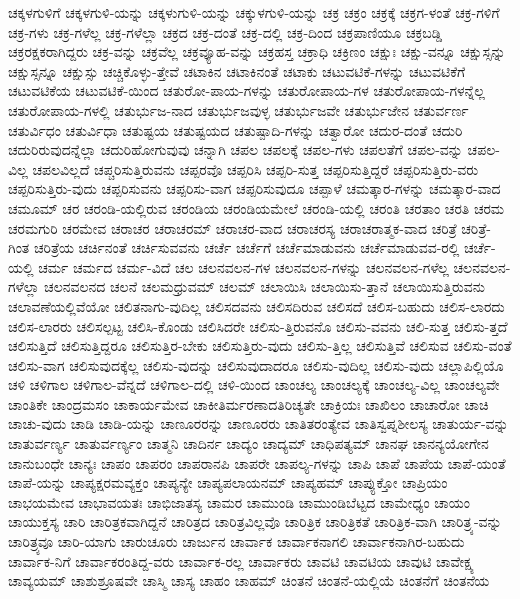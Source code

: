 {ಚಕ್ಕಳಗುಳಿಗೆ
ಚಕ್ಕಳಗುಳಿ-ಯನ್ನು
ಚಕ್ಕಳುಗುಳಿ-ಯನ್ನು
ಚಕ್ಕುಳಗುಳಿ-ಯನ್ನು
ಚಕ್ರ
ಚಕ್ರಂ
ಚಕ್ರಕ್ಕೆ
ಚಕ್ರಗ-ಳಂತೆ
ಚಕ್ರ-ಗಳಿಗೆ
ಚಕ್ರ-ಗಳು
ಚಕ್ರ-ಗಳೆಲ್ಲ
ಚಕ್ರ-ಗಳೆಲ್ಲಾ
ಚಕ್ರದ
ಚಕ್ರ-ದಂತೆ
ಚಕ್ರ-ದಲ್ಲಿ
ಚಕ್ರ-ದಿಂದ
ಚಕ್ರಪಾಣಿಯೂ
ಚಕ್ರಬಡ್ಡಿ
ಚಕ್ರರಕ್ಷಕರಾಗಿದ್ದರು
ಚಕ್ರ-ವನ್ನು
ಚಕ್ರವೆಲ್ಲ
ಚಕ್ರವ್ಯೂಹ-ವನ್ನು
ಚಕ್ರಹಸ್ತ
ಚಕ್ರಾಧಿ
ಚಕ್ರಿಣಂ
ಚಕ್ಷುಃ
ಚಕ್ಷು-ವನ್ನೂ
ಚಕ್ಷುಸ್ಸನ್ನು
ಚಕ್ಷುಸ್ಸನ್ನೂ
ಚಕ್ಷುಸ್ಸು
ಚಚ್ಚಿಕೊಳ್ಳು-ತ್ತೇವೆ
ಚಟಾಕಿನ
ಚಟಾಕಿನಂತೆ
ಚಟಾಕು
ಚಟುವಟಿಕೆ-ಗಳನ್ನು
ಚಟುವಟಿಕೆಗೆ
ಚಟುವಟಿಕೆಯ
ಚಟುವಟಿಕೆ-ಯಿಂದ
ಚತುರೋ-ಪಾಯ-ಗಳನ್ನು
ಚತುರೋಪಾಯ-ಗಳ
ಚತುರೋಪಾಯ-ಗಳನ್ನೆಲ್ಲ
ಚತುರೋಪಾಯ-ಗಳಲ್ಲಿ
ಚತುರ್ಭುಜ-ನಾದ
ಚತುರ್ಭುಜವುಳ್ಳ
ಚತುರ್ಭುಜವೇ
ಚತುರ್ಭುಜೇನ
ಚತುರ್ವರ್ಣ
ಚತುರ್ವಿಧಂ
ಚತುರ್ವಿಧಾ
ಚತುಷ್ಟಯ
ಚತುಷ್ಟಯದ
ಚತುಷ್ಪಾದಿ-ಗಳನ್ನು
ಚತ್ವಾರೋ
ಚದುರ-ದಂತೆ
ಚದುರಿ
ಚದುರಿರುವುದನ್ನೆಲ್ಲಾ
ಚದುರಿಹೋಗುವುವು
ಚನ್ನಾಗಿ
ಚಪಲ
ಚಪಲಕ್ಕೆ
ಚಪಲ-ಗಳು
ಚಪಲತೆಗೆ
ಚಪಲ-ವನ್ನು
ಚಪಲ-ವಿಲ್ಲ
ಚಪಲವಿಲ್ಲದೆ
ಚಪ್ಚರಿಸುತ್ತಿರುವನು
ಚಪ್ಪರವೊ
ಚಪ್ಪರಿಸಿ
ಚಪ್ಪರಿ-ಸುತ್ತ
ಚಪ್ಪರಿಸುತ್ತಿದ್ದರೆ
ಚಪ್ಪರಿಸುತ್ತಿರು-ವರು
ಚಪ್ಪರಿಸುತ್ತಿರು-ವುದು
ಚಪ್ಪರಿಸುವನು
ಚಪ್ಪರಿಸು-ವಾಗ
ಚಪ್ಪರಿಸುವುದೂ
ಚಪ್ಪಾಳೆ
ಚಮತ್ಕಾರ-ಗಳನ್ನು
ಚಮತ್ಕಾರ-ವಾದ
ಚಮೂಮ್
ಚರ
ಚರಂಡಿ-ಯಲ್ಲಿರುವ
ಚರಂಡಿಯ
ಚರಂಡಿಯಮೇಲೆ
ಚರಂಡಿ-ಯಲ್ಲಿ
ಚರಂತಿ
ಚರತಾಂ
ಚರತಿ
ಚರಮ
ಚರಮಗುರಿ
ಚರಮೇವ
ಚರಾಚರ
ಚರಾಚರಮ್
ಚರಾಚರ-ವಾದ
ಚರಾಚರಸ್ಯ
ಚರಾಚರಾತ್ಮಕ-ವಾದ
ಚರಿತ್ರೆ
ಚರಿತ್ರೆ-ಗಿಂತ
ಚರಿತ್ರೆಯ
ಚರ್ಚಿನಂತೆ
ಚರ್ಚಿಸುವವನು
ಚರ್ಚೆ
ಚರ್ಚೆಗೆ
ಚರ್ಚೆಮಾಡುವನು
ಚರ್ಚೆಮಾಡುವವ-ರಲ್ಲಿ
ಚರ್ಚೆ-ಯಲ್ಲಿ
ಚರ್ಮ
ಚರ್ಮದ
ಚರ್ಮ-ವಿದೆ
ಚಲ
ಚಲನವಲನ-ಗಳ
ಚಲನವಲನ-ಗಳನ್ನು
ಚಲನವಲನ-ಗಳೆಲ್ಲ
ಚಲನವಲನ-ಗಳೆಲ್ಲಾ
ಚಲನವಲನದ
ಚಲನೆ
ಚಲಮಧ್ರುವಮ್
ಚಲಮ್
ಚಲಾಯಿಸಿ
ಚಲಾಯಿಸು-ತ್ತಾನೆ
ಚಲಾಯಿಸುತ್ತಿರುವನು
ಚಲಾವಣೆಯಲ್ಲಿವೆಯೋ
ಚಲಿತನಾಗು-ವುದಿಲ್ಲ
ಚಲಿಸದವನು
ಚಲಿಸದಿರುವ
ಚಲಿಸದೆ
ಚಲಿಸ-ಬಹುದು
ಚಲಿಸ-ಲಾರದು
ಚಲಿಸ-ಲಾರರು
ಚಲಿಸಲ್ಪಟ್ಟ
ಚಲಿಸಿ-ಕೊಂಡು
ಚಲಿಸಿದರೇ
ಚಲಿಸು-ತ್ತಿರುವನೊ
ಚಲಿಸು-ವವನು
ಚಲಿ-ಸುತ್ತ
ಚಲಿಸು-ತ್ತದೆ
ಚಲಿಸುತ್ತಿದೆ
ಚಲಿಸುತ್ತಿದ್ದರೂ
ಚಲಿಸುತ್ತಿರ-ಬೇಕು
ಚಲಿಸುತ್ತಿರು-ವುದು
ಚಲಿಸು-ತ್ತಿಲ್ಲ
ಚಲಿಸುತ್ತಿವೆ
ಚಲಿಸುವ
ಚಲಿಸು-ವಂತೆ
ಚಲಿಸು-ವಾಗ
ಚಲಿಸುವುದಕ್ಕೆಲ್ಲ
ಚಲಿಸು-ವುದನ್ನು
ಚಲಿಸುವುದಾದರೂ
ಚಲಿಸು-ವುದಿಲ್ಲ
ಚಲಿಸು-ವುದು
ಚಲ್ಲಾಪಿಲ್ಲಿಯೊ
ಚಳಿ
ಚಳಿಗಾಲ
ಚಳಿಗಾಲ-ವೆನ್ನದೆ
ಚಳಿಗಾಲ-ದಲ್ಲಿ
ಚಳಿ-ಯಿಂದ
ಚಾಂಚಲ್ಯ
ಚಾಂಚಲ್ಯಕ್ಕೆ
ಚಾಂಚಲ್ಯ-ವಿಲ್ಲ
ಚಾಂಚಲ್ಯವೇ
ಚಾಂತಿಕೇ
ಚಾಂದ್ರಮಸಂ
ಚಾಕಾರ್ಯಮೇವ
ಚಾಕೀತಿರ್ಮರಣಾದತಿರಿಚ್ಯತೇ
ಚಾಕ್ರಿಯಃ
ಚಾಖಿಲಂ
ಚಾಚಾರೋ
ಚಾಚಿ
ಚಾಚು-ವುದು
ಚಾಡಿ
ಚಾಡಿ-ಯನ್ನು
ಚಾಣೂರರನ್ನು
ಚಾಣೂರರು
ಚಾತಿತರಂತ್ಯೇವ
ಚಾತಿಸ್ವಪ್ನಶೀಲಸ್ಯ
ಚಾತುರ್ಯ-ವನ್ನು
ಚಾತುರ್ವರ್ಣ್ಯ
ಚಾತುರ್ವರ್ಣ್ಯಂ
ಚಾತ್ಮನಿ
ಚಾದಿರ್ನ
ಚಾದ್ಯಂ
ಚಾದ್ಯಮ್
ಚಾಧಿಪತ್ಯಮ್
ಚಾನಘ
ಚಾನನ್ಯಯೋಗೇನ
ಚಾನುಬಂಧೇ
ಚಾನ್ಯಃ
ಚಾಪಂ
ಚಾಪರಂ
ಚಾಪರಾನಪಿ
ಚಾಪರೇ
ಚಾಪಲ್ಯ-ಗಳನ್ನು
ಚಾಪಿ
ಚಾಪೆ
ಚಾಪೆಯ
ಚಾಪೆ-ಯಂತೆ
ಚಾಪೆ-ಯನ್ನು
ಚಾಪ್ಯಕ್ಷರಮವ್ಯಕ್ತಂ
ಚಾಪ್ಯನ್ಯೇ
ಚಾಪ್ಯಪಲಾಯನಮ್
ಚಾಪ್ಯಹಮ್
ಚಾಪ್ಯುಕ್ತೋ
ಚಾಪ್ರಿಯಂ
ಚಾಭಯಮೇವ
ಚಾಭಾವಯತಃ
ಚಾಭಿಜಾತಸ್ಯ
ಚಾಮರ
ಚಾಮುಂಡಿ
ಚಾಮುಂಡಿಬೆಟ್ಟದ
ಚಾಮೇಧ್ಯಂ
ಚಾಯಂ
ಚಾಯುಕ್ತಸ್ಯ
ಚಾರಿ
ಚಾರಿತ್ರಕವಾಗಿದ್ದನೆ
ಚಾರಿತ್ರದ
ಚಾರಿತ್ರವಿಲ್ಲವೊ
ಚಾರಿತ್ರಿಕ
ಚಾರಿತ್ರಿಕತೆ
ಚಾರಿತ್ರಿಕ-ವಾಗಿ
ಚಾರಿತ್ರ್ಯ-ವನ್ನು
ಚಾರಿತ್ರ್ಯವೂ
ಚಾರಿ-ಯಾಗು
ಚಾರುಚೂರು
ಚಾರ್ಜುನ
ಚಾರ್ವಾಕ
ಚಾರ್ವಾಕನಾಗಲಿ
ಚಾರ್ವಾಕನಾಗಿರ-ಬಹುದು
ಚಾರ್ವಾಕ-ನಿಗೆ
ಚಾರ್ವಾಕರಂತಿದ್ದ-ವರು
ಚಾರ್ವಾಕ-ರಲ್ಲ
ಚಾರ್ವಾಕರು
ಚಾವಟಿ
ಚಾವಟಿಯ
ಚಾವುಟಿ
ಚಾವೇಕ್ಷ್ಯ
ಚಾವ್ಯಯಮ್
ಚಾಶುಶ್ರೂಷವೇ
ಚಾಸ್ಮಿ
ಚಾಸ್ಯ
ಚಾಹಂ
ಚಾಹಮ್
ಚಿಂತನೆ
ಚಿಂತನೆ-ಯಲ್ಲಿಯೆ
ಚಿಂತನೆಗೆ
ಚಿಂತನೆಯ
}
